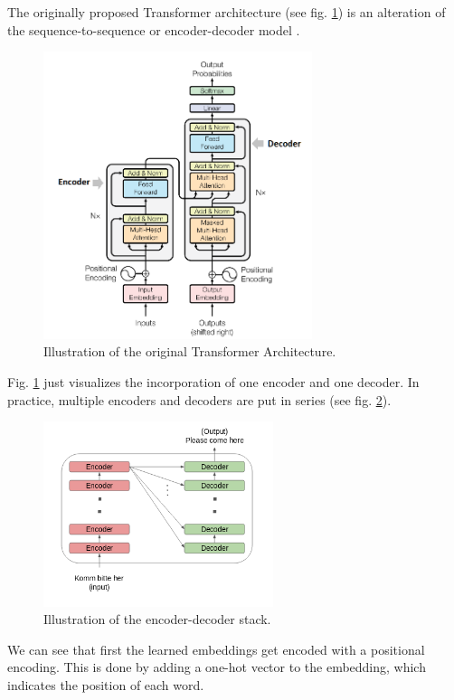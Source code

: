 The originally proposed Transformer architecture (see fig. \ref{fig:transformer-vis}) is an alteration of the sequence-to-sequence or encoder-decoder model \cite{attentionmechanism}. 
\begin{figure}[H]
    \centering
    \includegraphics[width=0.7\textwidth]{figures/transformer}
    \caption{Illustration of the original Transformer Architecture. \cite{vaswani2017attention}}
    \label{fig:transformer-vis}
\end{figure}
Fig. \ref{fig:transformer-vis} just visualizes the incorporation of one encoder and one decoder. In practice, multiple encoders and decoders are put in series (see fig. \ref{fig:transformer-mult}).
\begin{figure}[H]
    \centering
    \includegraphics[width=0.6\textwidth]{figures/mult_trafo}
    \caption{Illustration of the encoder-decoder stack. \cite{howdotrafo}}
    \label{fig:transformer-mult}
\end{figure}
We can see that first the learned embeddings get encoded with a positional encoding. This is done by adding a one-hot vector to the embedding, which indicates the position of each word. 


